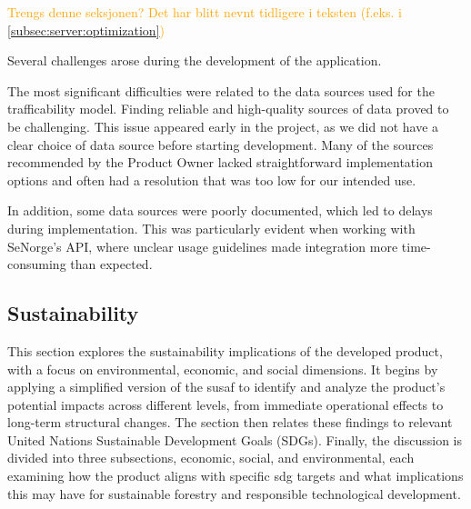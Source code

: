 \textcolor{orange}{Trengs denne seksjonen? Det har blitt nevnt tidligere i teksten (f.eks. i \autoref{subsec:server:optimization})}

Several challenges arose during the development of the application.

The most significant difficulties were related to the data sources used for the trafficability model. Finding reliable and high-quality sources of data proved to be challenging. This issue appeared early in the project, as we did not have a clear choice of data source before starting development. Many of the sources recommended by the Product Owner lacked straightforward implementation options and often had a resolution that was too low for our intended use.

In addition, some data sources were poorly documented, which led to delays during implementation. This was particularly evident when working with SeNorge's API, where unclear usage guidelines made integration more time-consuming than expected.


\subsection{Sustainability}\label{subsec:discussion:product:sustainability}

This section explores the sustainability implications of the developed product, with a focus on environmental, economic, and social dimensions. It begins by applying a simplified version of the \acrfull{susaf} to identify and analyze the product's potential impacts across different levels, from immediate operational effects to long-term structural changes. The section then relates these findings to relevant United Nations Sustainable Development Goals (SDGs). Finally, the discussion is divided into three subsections, economic, social, and environmental, each examining how the product aligns with specific \acrshort{sdg} targets and what implications this may have for sustainable forestry and responsible technological development.


